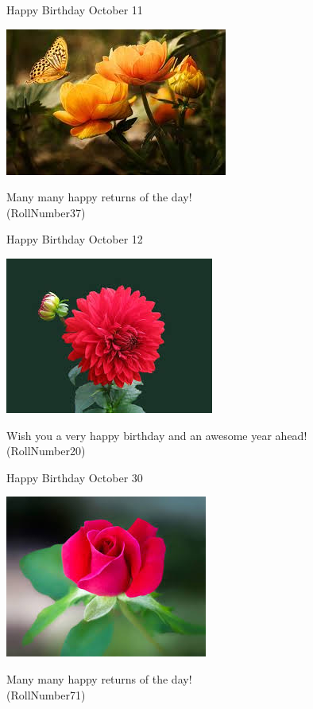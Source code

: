 \documentclass[table, landscape]{beamer}
\begin{document}
\begin{frame}{\color{red}Happy Birthday }
{October 11}
\begin{center}
\includegraphics[height=0.5\textheight]{flowers/f7.jpeg}

Many many happy returns of the day! \\ \vspace{0.5cm}{\Large name32} (RollNumber37)
\end{center}
\end{frame}
\begin{frame}{\color{blue}Happy Birthday }
{October 12}
\begin{center}
\includegraphics[height=0.5\textheight]{flowers/f1.jpeg}

Wish you a very happy birthday and an awesome year ahead! \\ \vspace{0.5cm}{\Large name15} (RollNumber20)
\end{center}
\end{frame}
\begin{frame}{\color{red}Happy Birthday }
{October 30}
\begin{center}
\includegraphics[height=0.5\textheight]{flowers/f3.jpeg}

Many many happy returns of the day! \\ \vspace{0.5cm}{\Large name64} (RollNumber71)
\end{center}
\end{frame}
\end{document}
